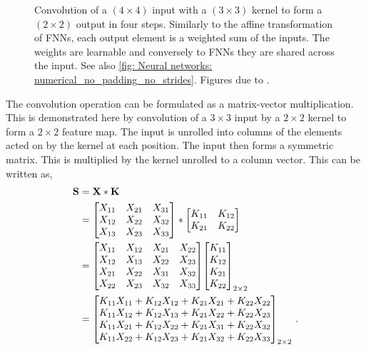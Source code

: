 \begin{figure}[tbp!]
\begin{subfigure}[b]{0.24\textwidth}
        \caption{}
        \label{fig: Neural networks: no_padding_no_strides_03}
    \end{subfigure}
    \caption{Convolution of a $(4\times4)$ input with a $(3\times3)$ kernel to form a $(2\times2)$ output in four steps. Similarly to the affine transformation of \glspl{FNN}, each output element is a weighted sum of the inputs. The weights are learnable and conversely to \glspl{FNN} they are shared across the input. See also \autoref{fig: Neural networks: numerical_no_padding_no_strides}. Figures due to \cite{Dumoulin2018}.}
    \label{fig: Neural networks: no_padding_no_strides}
\end{figure}

The convolution operation can be formulated as a matrix-vector multiplication. This is demonstrated here by convolution of a $3\times3$ input by a $2\times2$ kernel to form a $2\times2$ feature map. The input is unrolled into columns of the elements acted on by the kernel at each position. The input then forms a symmetric matrix. This is multiplied by the kernel unrolled to a column vector. This can be written as,
\begin{align*}
    \S
    &= \X * \K\\
    &=  \bmat{
            X_{11} & X_{21} & X_{31}\\
            X_{12} & X_{22} & X_{32}\\
            X_{13} & X_{23} & X_{33}
        } * 
        \bmat{
            K_{11} & K_{12}\\
            K_{21} & K_{22}
        }\\
    &=  \bmat{
            X_{11} & X_{12} & X_{21} & X_{22}\\
            X_{12} & X_{13} & X_{22} & X_{23}\\
            X_{21} & X_{22} & X_{31} & X_{32}\\
            X_{22} & X_{23} & X_{32} & X_{33}\\
        }
        \bmat{
            K_{11} \\ K_{12} \\ K_{21} \\ K_{22}
        }_{2\times2}\\
    &=  \bmat{
            K_{11}X_{11} + K_{12}X_{12} + K_{21}X_{21} + K_{22}X_{22}\\
            K_{11}X_{12} + K_{12}X_{13} + K_{21}X_{22} + K_{22}X_{23}\\
            K_{11}X_{21} + K_{12}X_{22} + K_{21}X_{31} + K_{22}X_{32}\\
            K_{11}X_{22} + K_{12}X_{23} + K_{21}X_{32} + K_{22}X_{33}
        }_{2\times2} \ . %
\end{align*}
